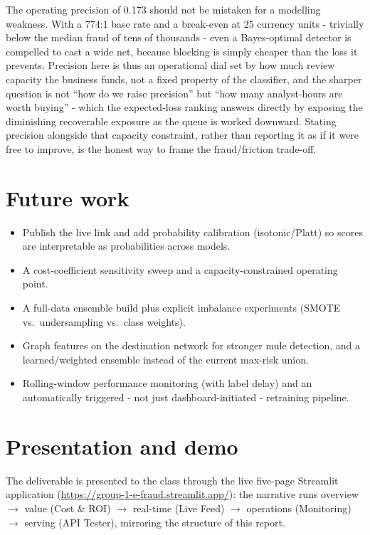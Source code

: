 \documentclass[11pt,a4paper]{report}
\begin{document}
The operating precision of 0.173 should not be mistaken for a modelling weakness. With a 774:1 base rate and a break-even at 25 currency units - trivially below the median fraud of tens of thousands - even a Bayes-optimal detector is compelled to cast a wide net, because blocking is simply cheaper than the loss it prevents. Precision here is thus an operational dial set by how much review capacity the business funds, not a fixed property of the classifier, and the sharper question is not ``how do we raise precision'' but ``how many analyst-hours are worth buying'' - which the expected-loss ranking answers directly by exposing the diminishing recoverable exposure as the queue is worked downward. Stating precision alongside that capacity constraint, rather than reporting it as if it were free to improve, is the honest way to frame the fraud/friction trade-off.

\section{Future work}

\begin{itemize}[nosep,leftmargin=1.4em]
  \item Publish the live link and add probability calibration (isotonic/Platt) so scores are
        interpretable as probabilities across models.
  \item A cost-coefficient sensitivity sweep and a capacity-constrained operating point.
  \item A full-data ensemble build plus explicit imbalance experiments (SMOTE vs.\
        undersampling vs.\ class weights).
  \item Graph features on the destination network for stronger mule detection, and a
        learned/weighted ensemble instead of the current max-risk union.
  \item Rolling-window performance monitoring (with label delay) and an automatically
        triggered - not just dashboard-initiated - retraining pipeline.
\end{itemize}

\section{Presentation and demo}

The deliverable is presented to the class through the live five-page Streamlit application
(\url{https://group-1-e-fraud.streamlit.app/}): the narrative runs overview $\to$ value
(Cost \& ROI) $\to$ real-time (Live Feed) $\to$ operations (Monitoring) $\to$ serving
(API Tester), mirroring the structure of this report.
\end{document}

